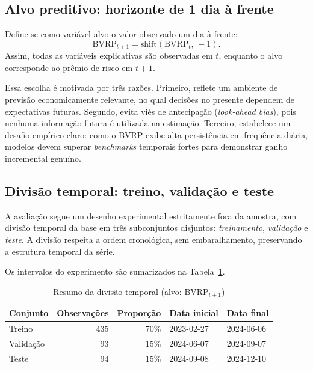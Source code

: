\subsection{Alvo preditivo: horizonte de 1 dia à frente}
\label{subsec:cap6_target_1d}

Define-se como variável-alvo o valor observado um dia à frente:
\begin{equation}
\text{BVRP}_{t+1} = \text{shift}\!\left(\text{BVRP}_{t},\,-1\right).
\label{eq:cap6_target}
\end{equation}
Assim, todas as variáveis explicativas são observadas em $t$, enquanto o alvo
corresponde ao prêmio de risco em $t+1$.

Essa escolha é motivada por três razões. Primeiro, reflete um ambiente de previsão
economicamente relevante, no qual decisões no presente dependem de expectativas
futuras. Segundo, evita viés de antecipação (\textit{look-ahead bias}), pois
nenhuma informação futura é utilizada na estimação. Terceiro, estabelece um desafio
empírico claro: como o BVRP exibe alta persistência em frequência diária, modelos
devem superar \textit{benchmarks} temporais fortes para demonstrar ganho incremental
genuíno.

\subsection{Divisão temporal: treino, validação e teste}
\label{subsec:cap6_time_split}

A avaliação segue um desenho experimental estritamente fora da amostra, com
divisão temporal da base em três subconjuntos disjuntos: \textit{treinamento},
\textit{validação} e \textit{teste}. A divisão respeita a ordem cronológica, sem
embaralhamento, preservando a estrutura temporal da série.

Os intervalos do experimento são sumarizados na Tabela~\ref{tab:cap6_split_summary}.

\begin{table}[H]
\centering
\caption{Resumo da divisão temporal (alvo: $\text{BVRP}_{t+1}$)}
\label{tab:cap6_split_summary}
\footnotesize
\begin{tabular}{lrrll}
\toprule
Conjunto & Observações & Proporção & Data inicial & Data final \\
\midrule
Treino    & 435 & 70\% & 2023-02-27 & 2024-06-06 \\
Validação &  93 & 15\% & 2024-06-07 & 2024-09-07 \\
Teste     &  94 & 15\% & 2024-09-08 & 2024-12-10 \\
\bottomrule
\end{tabular}
\end{table}

